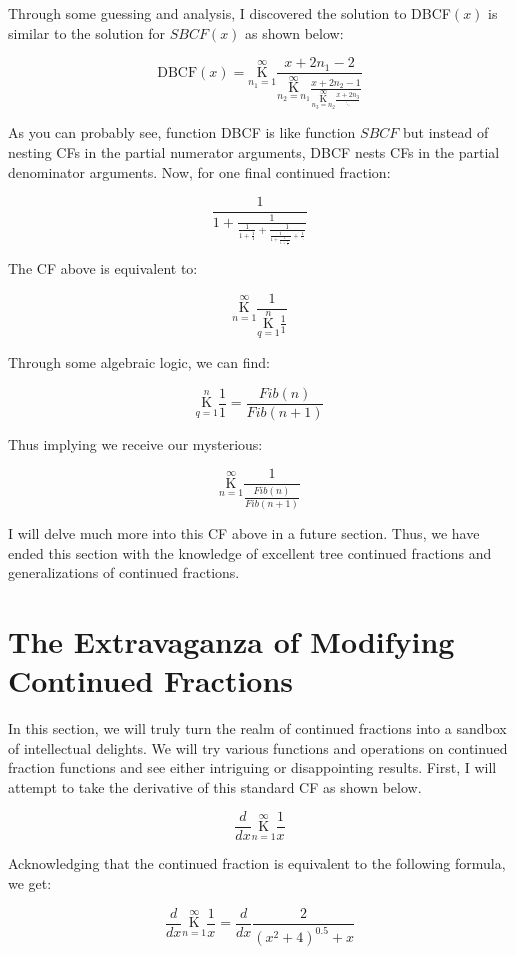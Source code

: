 \documentclass{article}
\begin{document}
Through some guessing and analysis, I discovered the solution to DBCF$(x)$ is similar to the solution for $SBCF(x)$ as shown below:

$$\text{DBCF}(x)=\underset{n_1=1}{\overset{\infty}{\mathrm K}} \frac{x+2n_1-2}{\underset{n_2=n_1}{\overset{\infty}{\mathrm K}} \frac{x+2n_2-1}{\underset{n_3=n_2}{\overset{\infty}{\mathrm K}} \frac{x+2n_3}{\ddots}}}$$

As you can probably see, function DBCF is like function $SBCF$ but instead of nesting CFs in the partial numerator arguments, DBCF nests CFs in the partial denominator arguments. Now, for one final continued fraction:

$$\frac{1}{1+\frac{1}{\frac{1}{1+\frac{1}{1}}+\frac{1}{\frac{1}{1+\frac{1}{1+\frac{1}{1}}}+\frac{1}{\ddots}}}}$$

The CF above is equivalent to:

$$\underset{n=1}{\overset{\infty}{\mathrm K}} \frac{1}{\underset{q=1}{\overset{n}{\mathrm K}} \frac{1}{1}}$$

Through some algebraic logic, we can find:

$$\underset{q=1}{\overset{n}{\mathrm K}} \frac{1}{1}=\frac{Fib(n)}{Fib(n+1)}$$

Thus implying we receive our mysterious:

$$\underset{n=1}{\overset{\infty}{\mathrm K}} \frac{1}{\frac{Fib(n)}{Fib(n+1)}}$$

I will delve much more into this CF above in a future section. Thus, we have ended this section with the knowledge of excellent tree continued fractions and generalizations of continued fractions.

\section{The Extravaganza of Modifying Continued Fractions}

In this section, we will truly turn the realm of continued fractions into a sandbox of intellectual delights. We will try various functions and operations on continued fraction functions and see either intriguing or disappointing results. First, I will attempt to take the derivative of this standard CF as shown below.

$$\frac{d}{dx} \underset{n=1}{\overset{\infty}{\mathrm K}} \frac{1}{x}$$

Acknowledging that the continued fraction is equivalent to the following formula, we get:

$$\frac{d}{dx} \underset{n=1}{\overset{\infty}{\mathrm K}} \frac{1}{x}=\frac{d}{dx} \frac{2}{(x^2+4)^{0.5}+x}$$
\end{document}
